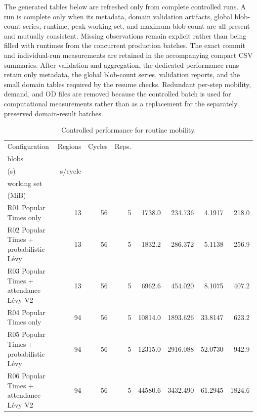 The generated tables below are refreshed only from complete controlled runs.
A run is complete only when its metadata, domain validation artifacts, global
blob-count series, runtime, peak working set, and maximum blob count are all
present and mutually consistent.  Missing observations remain explicit rather
than being filled with runtimes from the concurrent production batches.  The
exact commit and individual-run measurements are retained in the accompanying
compact CSV summaries.  After validation and aggregation, the dedicated
performance runs retain only metadata, the global blob-count series, validation
reports, and the small domain tables required by the resume checks.  Redundant
per-step mobility, demand, and OD files are removed because the controlled batch
is used for computational measurements rather than as a replacement for the
separately preserved domain-result batches.

\begingroup
\footnotesize
\setlength{\tabcolsep}{2.6pt}
\begin{table}[htbp]
\centering
\caption{Controlled performance for routine mobility.}
\label{tab:quantitative-performance-routine}
\begin{tabularx}{\textwidth}{@{}>{\raggedright\arraybackslash}Xrrrrrrr@{}}
\toprule
Configuration & Regions & Cycles & Reps. & \begin{tabular}[c]{@{}c@{}}Mean max.\\blobs\end{tabular} & \begin{tabular}[c]{@{}c@{}}Mean runtime\\(s)\end{tabular} & s/cycle & \begin{tabular}[c]{@{}c@{}}Mean peak\\working set\\(MiB)\end{tabular} \\
\midrule
R01 Popular Times only & 13 & 56 & 5 & 1738.0 & 234.736 & 4.1917 & 218.0 \\
R02 Popular Times + probabilistic Lévy & 13 & 56 & 5 & 1832.2 & 286.372 & 5.1138 & 256.9 \\
R03 Popular Times + attendance Lévy V2 & 13 & 56 & 5 & 6962.6 & 454.020 & 8.1075 & 407.2 \\
R04 Popular Times only & 94 & 56 & 5 & 10814.0 & 1893.626 & 33.8147 & 623.2 \\
R05 Popular Times + probabilistic Lévy & 94 & 56 & 5 & 12315.0 & 2916.088 & 52.0730 & 942.9 \\
R06 Popular Times + attendance Lévy V2 & 94 & 56 & 5 & 44580.6 & 3432.490 & 61.2945 & 1824.6 \\
\bottomrule
\end{tabularx}
\end{table}


